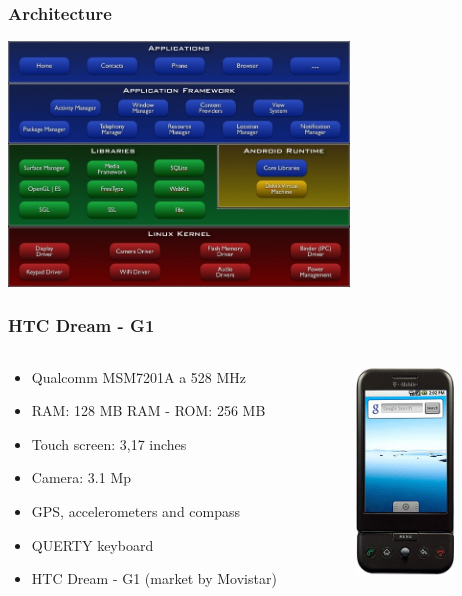 \documentclass{beamer}
\begin{document}

\begin{frame}
\frametitle{Architecture}
\begin{center}
  \includegraphics[height=6.5cm]{figs/android-architecture}
\end{center}
\end{frame}

\begin{frame}
\frametitle{HTC Dream - G1}

\begin{columns}
\begin{column}{0.63\textwidth}

\begin{itemize}
\item Qualcomm MSM7201A a 528 MHz
\item RAM: 128 MB RAM - ROM: 256 MB
\item Touch screen: 3,17 inches
\item Camera: 3.1 Mp
\item GPS, accelerometers and compass
\item QUERTY keyboard
\item HTC Dream - G1 (market by Movistar)
\end{itemize}
\end{column}

\begin{column}{0.4\textwidth}
\begin{center}
  \includegraphics[height=5.5cm]{figs/tmobile-g1}
\end{center}
\end{column}
\end{columns}
\end{frame}
\end{document}

